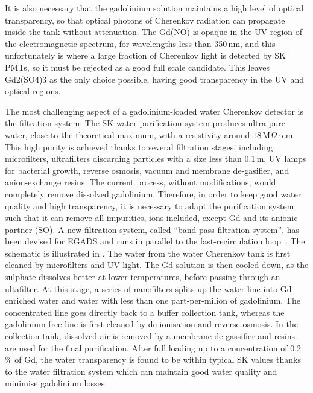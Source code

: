 It is also necessary that the gadolinium solution maintains a high level of optical transparency, %
so that optical photons of Cherenkov radiation can propagate inside the tank without attenuation.
The Gd(NO) is opaque in the UV region of the electromagnetic spectrum, for wavelengths less than 350\,nm, %
and this unfortunately is where a large fraction of Cherenkov light is detected by SK PMTs, %
so it must be rejected as a good full scale candidate.
This leaves Gd2(SO4)3 as the only choice possible, having good transparency in the UV and optical regions.

The most challenging aspect of a gadolinium-loaded water Cherenkov detector is the filtration system.
The SK water purification system produces ultra pure water, close to the theoretical maximum, %
with a resistivity around $18$\,M$\Omega\cdot$cm.
This high purity is achieved thanks to several filtration stages, including microfilters, %
ultrafilters discarding particles with a size less than 0.1\,\textmu m, UV lamps for bacterial growth, %
reverse osmosis, vacuum and membrane de-gasifier, and anion-exchange resins.
The current process, without modifications, would completely remove dissolved gadolinium.
Therefore, in order to keep good water quality and high transparency, it is necessary to adapt the purification system %
such that it can remove all impurities, ions included, except Gd and its anionic partner (SO).
A new filtration system, called ``band-pass filtration system'', has been devised for EGADS and runs in parallel to %
the fast-recirculation loop~\cite{Ikeda:2019pcm}.
The schematic is illustrated in .
The water from the water Cherenkov tank is first cleaned by microfilters and UV light.
The Gd solution is then cooled down, as the sulphate dissolves better at lower temperatures, %
before passing through an ultafilter.
At this stage, a series of nanofilters splits up the water line into Gd-enriched water and %
water with less than one part-per-milion of gadolinium.
The concentrated line goes directly back to a buffer collection tank, whereas the gadolinium-free line %
is first cleaned by de-ionisation and reverse osmosis.
In the collection tank, dissolved air is removed by a membrane de-gassifier and resins are used %
for the final purification.
After full loading up to a concentration of 0.2\,\% of Gd, the water transparency is found to be within typical SK values %
thanks to the water filtration system which can maintain good water quality and minimise gadolinium losses.

